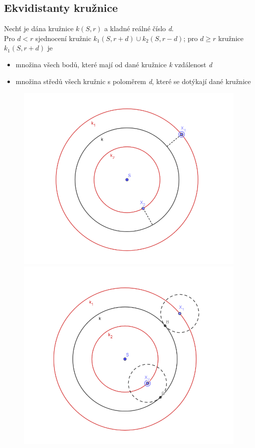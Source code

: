 \documentclass[12pt, a4paper]{article}
\begin{document}
\pagebreak

\subsection*{Ekvidistanty kružnice}
Nechť je dána kružnice $k(S,r)$ a kladné reálné číslo \textit{d}.\\
Pro $d < r$ sjednocení kružnic $k_1(S, r+d) \cup k_2(S, r-d)$; pro $d \geq r$ kružnice $k_1(S,r+d)$ je
\begin{itemize}
\item množina všech bodů, které mají od dané kružnice \textit{k} vzdálenost \textit{d}
\item množina středů všech kružnic s poloměrem \textit{d}, které se dotýkají dané kružnice
\end{itemize}
\begin{figure}[H]
\begin{minipage}{0.5\textwidth}
\includegraphics[scale=0.38]{ekvidistantykruznice1}
\end{minipage}%
\begin{minipage}{0.5\textwidth}
\includegraphics[scale=0.4]{ekvidistantykruznice2}
\end{minipage}
\end{figure}
\end{document}

